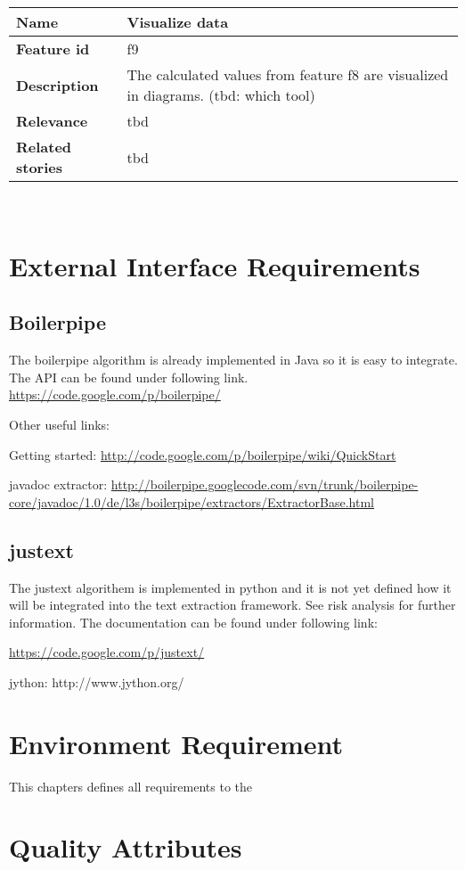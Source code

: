
	\begin{tabular}{ | p{3cm} | p{12cm} |}
	\hline
	\textbf{Name} 				& Visualize data \\ \hline
	\textbf{Feature id} 		& f9 \\ \hline
	\textbf{Description} 		& The calculated values from feature f8 are visualized in diagrams. (tbd: which tool)\\ \hline
	\textbf{Relevance} 			& tbd\\ \hline
	\textbf{Related stories} 	& tbd \\ \hline
	\end{tabular} \\

\section{External Interface Requirements}

\subsection{Boilerpipe}

The boilerpipe algorithm is already implemented in Java so it is easy to integrate. The API can be found under following link. 
\url{https://code.google.com/p/boilerpipe/}

Other useful links:

Getting started:
\url{http://code.google.com/p/boilerpipe/wiki/QuickStart}

javadoc extractor:
\url{http://boilerpipe.googlecode.com/svn/trunk/boilerpipe-core/javadoc/1.0/de/l3s/boilerpipe/extractors/ExtractorBase.html}


\subsection{justext}

The justext algorithem is implemented in python and it is not yet defined how it will be integrated into the text extraction framework. See risk analysis for further information.
The documentation can be found under following link: 

\url{https://code.google.com/p/justext/}

jython:
http://www.jython.org/


\section{Environment Requirement}

This chapters defines all requirements to the 

\section{Quality Attributes}


